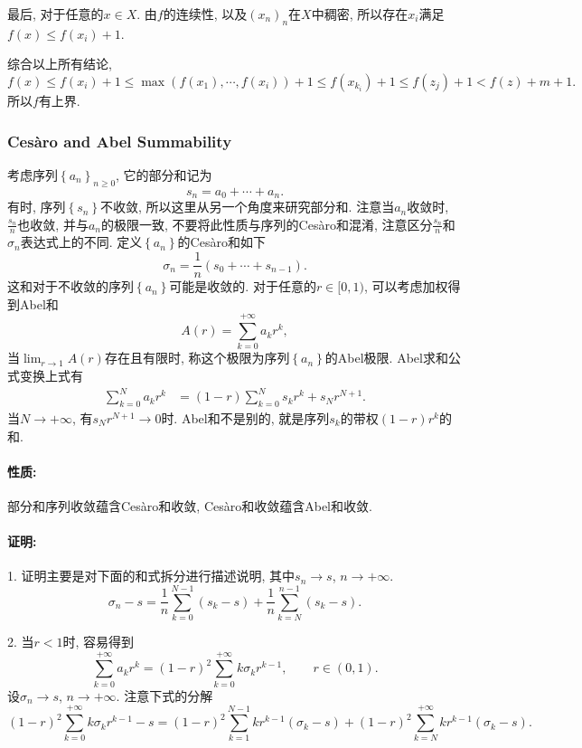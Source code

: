 最后, 对于任意的$x\in X$. 由$f$的连续性, 以及$\left(x_{n}\right)_{n}$在$X$中稠密,
所以存在$x_{i}$满足$f(x)\le f(x_{i})+1$.

综合以上所有结论, 
\[
f(x)\le f(x_{i})+1\le\max\left(f(x_{1}),\cdots,f(x_{i})\right)+1\le f\left(x_{k_{i}}\right)+1\le f(z_{j})+1<f(z)+m+1.
\]
所以$f$有上界.
\ea

\subsubsection{Ces\`{a}ro and Abel Summability}

考虑序列$\left\{ a_{n}\right\} _{n\ge0}$, 它的部分和记为
\[
s_{n}=a_{0}+\cdots+a_{n}.
\]
有时, 序列$\left\{ s_{n}\right\} $不收敛, 所以这里从另一个角度来研究部分和. 注意当$a_{n}$收敛时,
$\frac{s_{n}}{n}$也收敛, 并与$a_{n}$的极限一致, 不要将此性质与序列的Ces\`{a}ro和混淆,
注意区分$\frac{s_{n}}{n}$和$\sigma_{n}$表达式上的不同. 定义$\left\{ a_{n}\right\} $的Ces\`{a}ro和如下
\[
\sigma_{n}=\frac{1}{n}(s_{0}+\cdots+s_{n-1}).
\]
这和对于不收敛的序列$\left\{ a_{n}\right\} $可能是收敛的. 对于任意的$r\in[0,1)$, 可以考虑加权得到Abel和
\[
A(r)=\sum_{k=0}^{+\infty}a_{k}r^{k},
\]
当$\lim_{r\to1}A(r)$存在且有限时, 称这个极限为序列$\left\{ a_{n}\right\} $的Abel极限.
Abel求和公式变换上式有
\begin{align*}
	\sum_{k=0}^{N}a_{k}r^{k} & =(1-r)\sum_{k=0}^{N}s_{k}r^{k}+s_{N}r^{N+1}.
\end{align*}
当$N\to+\infty$, 有$s_{N}r^{N+1}\to0$时. Abel和不是别的, 就是序列$s_{k}$的带权$(1-r)r^{k}$的和.

\paragraph{性质: }

部分和序列收敛蕴含Ces\`{a}ro和收敛, Ces\`{a}ro和收敛蕴含Abel和收敛.

\paragraph{证明:}

1. 证明主要是对下面的和式拆分进行描述说明, 其中$s_{n}\to s$, $n\to+\infty$.
\[
\sigma_{n}-s=\frac{1}{n}\sum_{k=0}^{N-1}(s_{k}-s)+\frac{1}{n}\sum_{k=N}^{n-1}(s_{k}-s).
\]

2. 当$r<1$时, 容易得到
\[
\sum_{k=0}^{+\infty}a_{k}r^{k}=(1-r)^{2}\sum_{k=0}^{+\infty}k\sigma_{k}r^{k-1},\qquad r\in(0,1).
\]
设$\sigma_{n}\to s$, $n\to+\infty$. 注意下式的分解
\[
(1-r)^{2}\sum_{k=0}^{+\infty}k\sigma_{k}r^{k-1}-s=(1-r)^{2}\sum_{k=1}^{N-1}kr^{k-1}\left(\sigma_{k}-s\right)+(1-r)^{2}\sum_{k=N}^{+\infty}kr^{k-1}\left(\sigma_{k}-s\right).
\]


